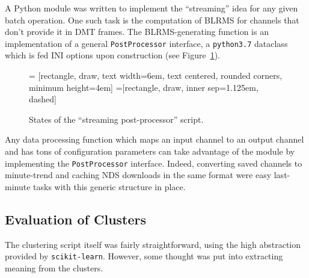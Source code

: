 \documentclass[colorlinks=true,pdfstartview=FitV,linkcolor=blue,
            citecolor=red,urlcolor=magenta]{ligodoc}
\begin{document}
A Python module was written to implement the ``streaming'' idea for any given batch operation.
One such task is the computation of BLRMS for channels that don't provide it in DMT frames.
The BLRMS-generating function is an implementation of a general \texttt{PostProcessor} interface, a \texttt{python3.7} dataclass which is fed INI options upon construction (see Figure~\ref{fig:pp}).
\begin{figure}[h]
   = [rectangle, draw, text width=6em, text centered, rounded corners, minimum height=4em]
   =[rectangle, draw, inner sep=1.125em, dashed]
  \caption{States of the ``streaming post-processor'' script.}\label{fig:pp}
\end{figure}

Any data processing function which maps an input channel to an output channel and has tons of configuration parameters can take advantage of the module by implementing the \texttt{PostProcessor} interface.
Indeed, converting saved channels to minute-trend and caching NDS downloads in the same format were easy last-minute tasks with this generic structure in place.

\subsection{Evaluation of Clusters}
The clustering script itself was fairly straightforward, using the high abstraction provided by \texttt{scikit-learn}.
However, some thought was put into extracting meaning from the clusters.
\end{document}
